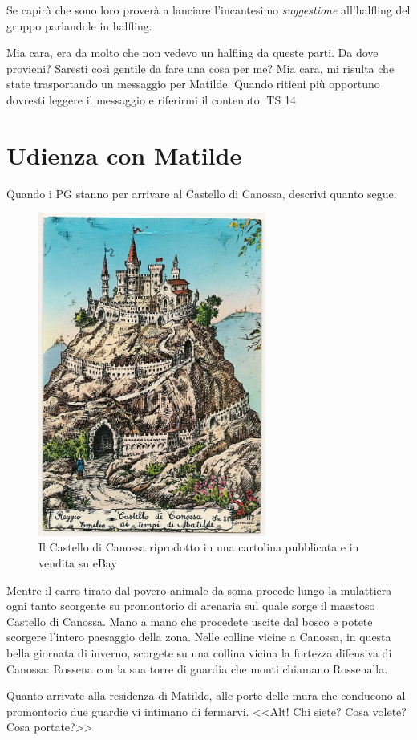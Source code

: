 \documentclass[letterpaper,twocolumn,openany,nodeprecatedcode]{dndbook}
\begin{document}
Se capirà che sono loro proverà a lanciare l'incantesimo \textit{suggestione} all'halfling del gruppo parlandole in halfling.


\begin{DndReadAloud}
Mia cara, era da molto che non vedevo un halfling da queste parti. Da dove provieni?
Saresti così gentile da fare una cosa per me? Mia cara, mi risulta che state trasportando un messaggio per Matilde. Quando ritieni più opportuno dovresti leggere il messaggio e riferirmi il contenuto. TS 14
\end{DndReadAloud}


\section{Udienza con Matilde}
Quando i PG stanno per arrivare al Castello di Canossa, descrivi quanto segue.

\begin{figure}
\centering
\includegraphics[width=7.5cm]{img/castello.png}
\caption{Il Castello di Canossa riprodotto in una cartolina pubblicata e in vendita su eBay}
\label{castello}
\end{figure}


\begin{DndReadAloud}
Mentre il carro tirato dal povero animale da soma procede lungo la mulattiera ogni tanto scorgente su promontorio di arenaria sul quale sorge il maestoso Castello di Canossa. Mano a mano che procedete uscite dal bosco e potete scorgere l'intero paesaggio della zona. Nelle colline vicine a Canossa, in questa bella giornata di inverno, scorgete su una collina vicina la fortezza difensiva di Canossa: Rossena con la sua torre di guardia che monti chiamano Rossenalla.

Quanto arrivate alla residenza di Matilde, alle porte delle mura che conducono al promontorio due guardie vi intimano di fermarvi. <<Alt! Chi siete? Cosa volete? Cosa portate?>>
\end{DndReadAloud}

{}

\end{document}
